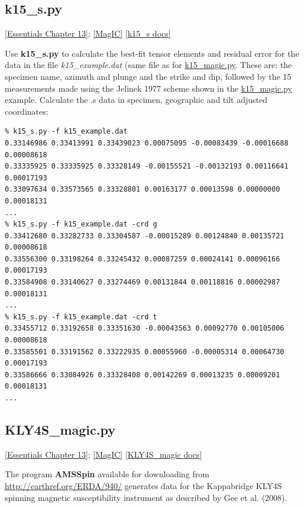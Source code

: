 \documentclass[11pt]{book}
\begin{document}
{{{
\subsection{k15\_s.py}  
\href{http://magician.ucsd.edu/Essentials_2/WebBook2ch13.html#ch13}{[Essentials Chapter 13]}; 
\href{#MagIC}{[MagIC]}
\href{http://earthref.org/PmagPy/pmagpydocs/k15_s-module.html}{[k15\_s docs]}

%
Use {\bf k15\_s.py} to calculate the best-fit tensor elements and residual error for the data in the file {\it k15\_example.dat} (same file as for \href{#k15_magic.py}{k15\_magic.py}.  These are: the specimen name, azimuth and plunge and the strike and dip, followed by the 15 measurements made using the Jelinek 1977 \nocite{jelinek77} scheme shown in the \href{#k15_magic.py}{k15\_magic.py} example.  Calculate the .s data in specimen, geographic  and tilt adjusted coordinates:

\begin{verbatim}
% k15_s.py -f k15_example.dat
0.33146986 0.33413991 0.33439023 0.00075095 -0.00083439 -0.00016688 0.00008618
0.33335925 0.33335925 0.33328149 -0.00155521 -0.00132193 0.00116641 0.00017193
0.33097634 0.33573565 0.33328801 0.00163177 0.00013598 0.00000000 0.00018131
...
% k15_s.py -f k15_example.dat -crd g
0.33412680 0.33282733 0.33304587 -0.00015289 0.00124840 0.00135721 0.00008618
0.33556300 0.33198264 0.33245432 0.00087259 0.00024141 0.00096166 0.00017193
0.33584908 0.33140627 0.33274469 0.00131844 0.00118816 0.00002987 0.00018131
...
% k15_s.py -f k15_example.dat -crd t
0.33455712 0.33192658 0.33351630 -0.00043563 0.00092770 0.00105006 0.00008618
0.33585501 0.33191562 0.33222935 0.00055960 -0.00005314 0.00064730 0.00017193
0.33586666 0.33084926 0.33328408 0.00142269 0.00013235 0.00009201 0.00018131
...
\end{verbatim}

%


\subsection{KLY4S\_magic.py}  \href{http://magician.ucsd.edu/Essentials_2/WebBook2ch13.html#ch13}{[Essentials Chapter 13]}; 
\href{#MagIC}{[MagIC]}
\href{http://earthref.org/PmagPy/pmagpydocs/KLY4S_magic-module.html}{[KLY4S\_magic docs]}

The program {\bf AMSSpin} available for downloading from \url{http://earthref.org/ERDA/940/}  generates data for the Kappabridge KLY4S spinning magnetic susceptibility instrument as described by Gee et al. (2008).  \nocite{gee08}  

}}}
\end{document}
